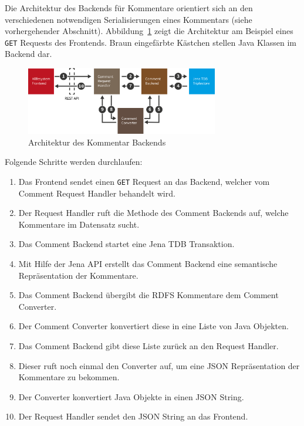 \documentclass[
	headsepline,
	footsepline,
	fontsize=12pt,
	bibliography=totoc
]{scrbook}
\begin{document}
Die Architektur des Backends für Kommentare orientiert sich an den verschiedenen notwendigen Serialisierungen eines Kommentars (siehe vorhergehender Abschnitt). Abbildung~\ref{figure:kommentare-backend-architektur} zeigt die Architektur am Beispiel eines \texttt{GET} Requests des Frontends. Braun eingefärbte Kästchen stellen Java Klassen im Backend dar.

\begin{figure}[htbp]
   \centering
   \includegraphics[width=0.75\textwidth]{images/implementierung-kommentare-backend-architektur.png}
   \caption{Architektur des Kommentar Backends}
   \label{figure:kommentare-backend-architektur}
\end{figure}

Folgende Schritte werden durchlaufen:

\begin{enumerate}
	\item Das Frontend sendet einen \texttt{GET} Request an das Backend, welcher vom Comment Request Handler behandelt wird.
	\item Der Request Handler ruft die Methode des Comment Backends auf, welche Kommentare im Datensatz sucht.
	\item Das Comment Backend startet eine Jena TDB Transaktion.
	\item Mit Hilfe der Jena API erstellt das Comment Backend eine semantische Repräsentation der Kommentare.
	\item Das Comment Backend übergibt die RDFS Kommentare dem Comment Converter.
	\item Der Comment Converter konvertiert diese in eine Liste von Java Objekten.
	\item Das Comment Backend gibt diese Liste zurück an den Request Handler.
	\item Dieser ruft noch einmal den Converter auf, um eine JSON Repräsentation der Kommentare zu bekommen.
	\item Der Converter konvertiert Java Objekte in einen JSON String.
	\item Der Request Handler sendet den JSON String an das Frontend.
\end{enumerate}
\end{document}
